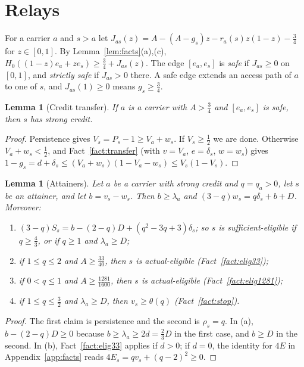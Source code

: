 \documentclass[11pt,a4paper]{article}
\numberwithin{equation}{section}
\newtheorem{lemma}[theorem]{Lemma}
\theoremstyle{definition}
\begin{document}
\section{Relays}\label{sec:relays}

For a carrier $a$ and $s>a$ let
$J_{as}(z)=A-(A-g_s)z-r_a(s)z(1-z)-\frac34$ for $z\in[0,1]$. By
Lemma~\ref{lem:facts}(a),(c), $H_0((1-z)e_a+ze_s)\ge\frac34+J_{as}(z)$. The edge
$[e_a,e_s]$ is \emph{safe} if $J_{as}\ge0$ on $[0,1]$, and \emph{strictly safe}
if $J_{as}>0$ there. A safe edge extends an access path of $a$ to one of $s$,
and $J_{as}(1)\ge0$ means $g_s\ge\frac34$.

\begin{lemma}[Credit transfer]\label{lem:transfer}If $a$ is a carrier with $A>\frac34$ and $[e_a,e_s]$ is safe, then $s$ has
strong credit.
\end{lemma}

\begin{proof}
Persistence gives $V_s=P_s-1\ge V_a+w_s$. If $V_s\ge\frac12$ we are done.
Otherwise $V_a+w_s<\frac12$, and Fact~\ref{fact:transfer} (with $v=V_a$,
$e=\delta_s$, $w=w_s$) gives
$1-g_s=d+\delta_s\le(V_a+w_s)(1-V_a-w_s)\le V_s(1-V_s)$.
\end{proof}

\begin{lemma}[Attainers]\label{lem:attainers}
Let $a$ be a carrier with strong credit and $q=q_a>0$, let $s$ be an attainer,
and let $b=v_s-w_s$. Then $b\ge\lambda_a$ and $(3-q)w_s=q\delta_s+b+D$.
Moreover:
\begin{enumerate}[label=(\alph*)]
\item $(3-q)S_s=b-(2-q)D+(q^2-3q+3)\delta_s$; so $s$ is sufficient-eligible if
$q\ge\frac43$, or if $q\ge1$ and $\lambda_a\ge D$;
\item if $1\le q\le2$ and $A\ge\frac{33}{40}$, then $s$ is actual-eligible
(Fact~\ref{fact:elig33});
\item if $0<q\le1$ and $A\ge\frac{1281}{1600}$, then $s$ is actual-eligible
(Fact~\ref{fact:elig1281});
\item if $1\le q\le\frac32$ and $\lambda_a\ge D$, then $v_s\ge\theta(q)$
(Fact~\ref{fact:stop}).
\end{enumerate}
\end{lemma}

\begin{proof}
The first claim is persistence and the second is $\rho_s=q$. In (a),
$b-(2-q)D\ge0$ because $b\ge\lambda_a\ge2d=\frac23D$ in the first case, and
$b\ge D$ in the second. In (b), Fact~\ref{fact:elig33} applies if $d>0$; if
$d=0$, the identity for $4E$ in Appendix~\ref{app:facts} reads
$4E_s=qv_s+(q-2)^2\ge0$.
\end{proof}
\end{document}
